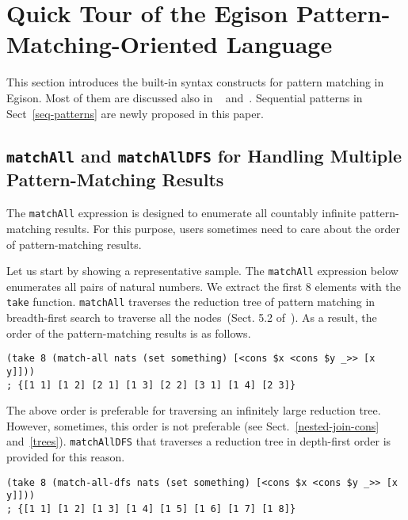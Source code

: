 \documentclass{article}
\begin{document}
\section{Quick Tour of the Egison Pattern-Matching-Oriented Language}\label{quick-tour}

This section introduces the built-in syntax constructs for pattern matching in Egison.
Most of them are discussed also in ~\cite{egi2018Aplas} and~\cite{egi2018loop}.
Sequential patterns in Sect~\ref{seq-patterns} are newly proposed in this paper.

\subsection{\texttt{matchAll} and \texttt{matchAllDFS} for Handling Multiple Pattern-Matching Results}


The \texttt{matchAll} expression is designed to enumerate all countably infinite pattern-matching results.
For this purpose, users sometimes need to care about the order of pattern-matching results.

Let us start by showing a representative sample.
The \texttt{matchAll} expression below enumerates all pairs of natural numbers.
We extract the first $8$ elements with the \texttt{take} function.
\texttt{matchAll} traverses the reduction tree of pattern matching in breadth-first search to traverse all the nodes~(Sect. 5.2 of~\cite{egi2018Aplas}).
As a result, the order of the pattern-matching results is as follows.

\begin{lstlisting}[language=egison]
(take 8 (match-all nats (set something) [<cons $x <cons $y _>> [x y]]))
; {[1 1] [1 2] [2 1] [1 3] [2 2] [3 1] [1 4] [2 3]}
\end{lstlisting}

The above order is preferable for traversing an infinitely large reduction tree.
However, sometimes, this order is not preferable (see Sect.~\ref{nested-join-cons} and~\ref{trees}).
\texttt{matchAllDFS} that traverses a reduction tree in depth-first order is provided for this reason.

\begin{lstlisting}[language=egison]
(take 8 (match-all-dfs nats (set something) [<cons $x <cons $y _>> [x y]]))
; {[1 1] [1 2] [1 3] [1 4] [1 5] [1 6] [1 7] [1 8]}
\end{lstlisting}
\end{document}
